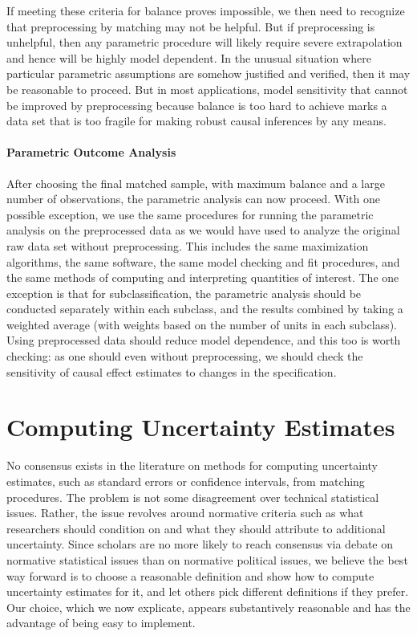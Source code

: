 \documentclass[11pt,titlepage]{article}
\begin{document}
If meeting these criteria for balance proves impossible, we then need
to recognize that preprocessing by matching may not be helpful.  But
if preprocessing is unhelpful, then any parametric procedure will
likely require severe extrapolation and hence will be highly model
dependent.  In the unusual situation where particular parametric
assumptions are somehow justified and verified, then it may be
reasonable to proceed.  But in most applications, model sensitivity
that cannot be improved by preprocessing because balance is too hard
to achieve marks a data set that is too fragile for making robust
causal inferences by any means.

\paragraph{Parametric Outcome Analysis}  
After choosing the final matched sample, with maximum balance and a
large number of observations, the parametric analysis can now proceed.
With one possible exception, we use the same procedures for running
the parametric analysis on the preprocessed data as we would have used
to analyze the original raw data set without preprocessing.  This
includes the same maximization algorithms, the same software, the same
model checking and fit procedures, and the same methods of computing
and interpreting quantities of interest.  The one exception is that
for subclassification, the parametric analysis should be conducted
separately within each subclass, and the results combined by taking a
weighted average (with weights based on the number of units in each
subclass).  Using preprocessed data should reduce model dependence,
and this too is worth checking: as one should even without
preprocessing, we should check the sensitivity of causal effect
estimates to changes in the specification.

\section{Computing Uncertainty Estimates}

No consensus exists in the literature on methods for computing
uncertainty estimates, such as standard errors or confidence
intervals, from matching procedures.  The problem is not some
disagreement over technical statistical issues.  Rather, the issue
revolves around normative criteria such as what researchers should
condition on and what they should attribute to additional uncertainty.
Since scholars are no more likely to reach consensus via debate on
normative statistical issues than on normative political issues, we
believe the best way forward is to choose a reasonable definition and
show how to compute uncertainty estimates for it, and let others pick
different definitions if they prefer.  Our choice, which we now
explicate, appears substantively reasonable and has the advantage of
being easy to implement.
\end{document}
